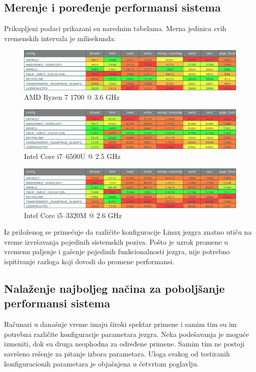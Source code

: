 \documentclass[12pt]{report}
\begin{document}
\subsection{Merenje i poređenje performansi sistema}\label{benchmark}
Prikupljeni podaci prikazani su narednim tabelama. Merna jedinica svih vremenskih intervala je milisekunda:

\begin{figure}[H]
    \includegraphics[width=\linewidth]{images/neon.png}
    \caption{AMD Ryzen 7 1700 @ 3.6 GHz}
\end{figure}

\begin{figure}[H]
    \includegraphics[width=\linewidth]{images/jelena.png}
    \caption{Intel Core i7--6500U @ 2.5 GHz}
\end{figure}

\begin{figure}[H]
    \includegraphics[width=\linewidth]{images/natrium.png}
    \caption{Intel Core i5--3320M @ 2.6 GHz}
\end{figure}

Iz priloženog se primećuje da različite konfiguracije Linux jezgra znatno utiču na vreme izvršavanja pojedinih sistemskih poziva. Pošto je uzrok promene u vremenu paljenje i gašenje pojedinih funkcionalnosti jezgra, nije potrebno ispitivanje razloga koji dovodi do promene performansi.

\subsection{Nalaženje najboljeg načina za poboljšanje performansi sistema}
Računari u današnje vreme imaju široki spektar primene i samim tim su im potrebna različite konfiguracije parametara jezgra. Neka podešavanja je moguće izmeniti, dok su druga neophodna za određene primene. Samim tim ne postoji savršeno rešenje za pitanje izbora parametara. Uloga svakog od testiranih konfiguracionih parametara je objašnjena u četvrtom poglavlju.
\end{document}

